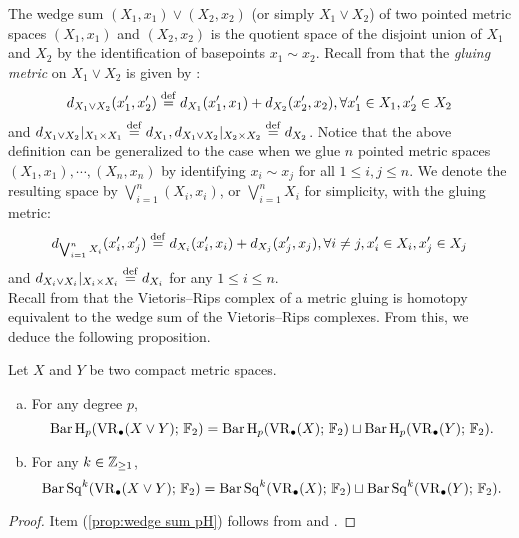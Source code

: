 The wedge sum $(X_1,x_1)\vee (X_2,x_2)$ (or simply $X_1\vee X_2$) of two pointed metric spaces $(X_1,x_1)$ and $(X_2,x_2)$ is the quotient space of the disjoint union of $X_1$ and $X_2$ by the identification of basepoints $x_1\sim x_2$.
Recall from \cite{burago2001course} that the \emph{gluing metric} on $X_1\vee X_2$ is given by \label{para:gluing}: %
$$d_{X_1\vee X_2}(x_1',x_2')\stackrel{\mathrm{def}}{=} d_{X_1}(x_1',x_1)+d_{X_2}(x_2',x_2),\forall x_1'\in X_1, x_2'\in X_2$$
and $d_{X_1\vee X_2}\vert_{X_1\times X_1}\stackrel{\mathrm{def}}{=} d_{X_1},d_{X_1\vee X_2}\vert_{X_2\times X_2}\stackrel{\mathrm{def}}{=} d_{X_2}$. Notice that the above definition can be generalized to the case when we glue $n$ pointed metric spaces $(X_1,x_1),\cdots,(X_n,x_n)$ by identifying $x_i\sim x_j$ for all $1\leq i,j\leq n$. We denote the resulting space by $\bigvee_{i=1}^n (X_i,x_i)$, or $\bigvee_{i=1}^n X_i$ for simplicity, with the gluing metric:
$$d_{\bigvee_{i=1}^n X_i}(x_i',x_j')\stackrel{\mathrm{def}}{=} d_{X_i}(x_i',x_i)+d_{X_j}(x_j',x_j),\forall i\neq j, x_i'\in X_i, x_j'\in X_j$$
and $d_{X_i\vee X_i}|_{X_i\times X_i}\stackrel{\mathrm{def}}{=} d_{X_i}$ for any $1\leq i\leq n$.\\


Recall from \cite[Proposition 3.7]{adamaszek2020homotopy} that the Vietoris--Rips complex of a metric gluing is homotopy equivalent to the wedge sum of the Vietoris--Rips complexes. From this, we deduce the following proposition. 

\begin{proposition}\label{prop:wedge sum}
	Let $X$ and $Y$ be two compact metric spaces.
	\begin{enumerate}[(a)]
		\item\label{prop:wedge sum pH} For any degree $p$,
		\begin{equation*}\label{eq:wedge sum pH}
			\operatorname{Bar} \operatorname{H}_{p}(\operatorname{VR}_\bullet(X\vee Y);\,{\mathbb{F}_2})= \operatorname{Bar} \operatorname{H}_{p}(\operatorname{VR}_\bullet(X);\,{\mathbb{F}_2})\sqcup \operatorname{Bar} \operatorname{H}_{p}(\operatorname{VR}_\bullet(Y);\,{\mathbb{F}_2}).
		\end{equation*}
		\item\label{prop:wedge sum Sq} For any $k\in \mathbb{Z}_{\geq 1}$,
		\begin{equation*}\label{eq:wedge sum Sq}
			\operatorname{Bar}\operatorname{Sq}^{k}(\operatorname{VR}_\bullet(X\vee Y);\,{\mathbb{F}_2})= \operatorname{Bar}\operatorname{Sq}^{k}(\operatorname{VR}_\bullet(X);\,{\mathbb{F}_2})\sqcup \operatorname{Bar}\operatorname{Sq}^{k}(\operatorname{VR}_\bullet(Y);\,{\mathbb{F}_2}).
		\end{equation*}
	\end{enumerate}
\end{proposition}
\begin{proof}
	Item (\ref{prop:wedge sum pH}) follows from \cite[Proposition 3.7]{adamaszek2020homotopy} and \cite[Thoerem 9 (2)]{lim2020vietoris}.

\end{proof}

